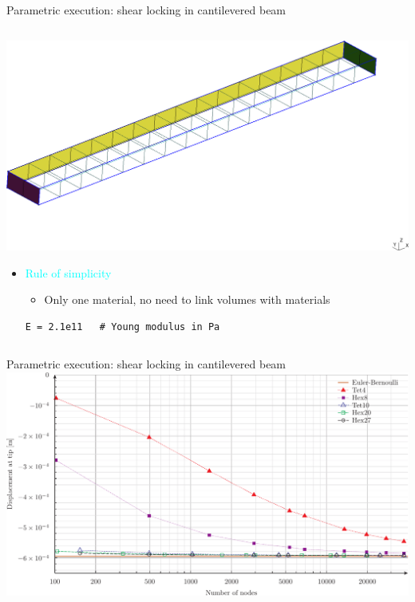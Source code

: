 \documentclass[
  ignorenonframetext,
  aspectratio=169,
]{beamer}
\providecommand{\tightlist}{%
  \setlength{\itemsep}{0pt}\setlength{\parskip}{0pt}}
\begin{document}
\begin{frame}[fragile]{Parametric execution: shear locking in
cantilevered beam}
\begin{columns}[T]
\begin{column}{0.4\textwidth}
\includegraphics{cantilever-hex.png}

\begin{itemize}
\item
  {\textcolor{cyan}{Rule of {simplicity}}}

  \begin{itemize}
  \tightlist
  \item
    Only one material, no need to link volumes with materials
  \end{itemize}

\begin{lstlisting}[style=feenox]
E = 2.1e11   # Young modulus in Pa
\end{lstlisting}
\end{itemize}
\end{column}
\end{columns}
\end{frame}

\begin{frame}{Parametric execution: shear locking in cantilevered beam}
\protect\hypertarget{parametric-execution-shear-locking-in-cantilevered-beam-1}{}
\includegraphics{cantilever-displacement.pdf}
\end{frame}
\end{document}
